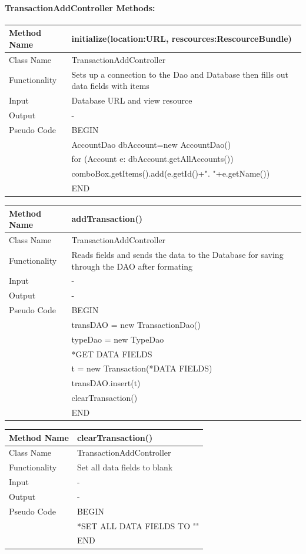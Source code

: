 \documentclass[12pt]{article}
\begin{document}
\paragraph{TransactionAddController Methods:}
\begin{tabular}{ |p{3cm}||p{\colWidth}|  }
	\hline
	Method Name &  initialize(location:URL, rescources:RescourceBundle) \\
	\hline
	Class Name & TransactionAddController\\
	\hline
	Functionality & Sets up a connection to the Dao and Database then fills out data fields with items\\
	\hline
	Input & Database URL and view resource\\
	\hline
	Output & -\\
	\hline
	Pseudo Code & BEGIN\\
	& 		AccountDao dbAccount=new AccountDao() \\
	& 	for (Account e: dbAccount.getAllAccounts()) \\
	&		comboBox.getItems().add(e.getId()+". "+e.getName()) \\
	& END\\
	\hline
\end{tabular}  

\begin{tabular}{ |p{3cm}||p{\colWidth}|  }
	\hline
	Method Name &  addTransaction() \\
	\hline
	Class Name & TransactionAddController\\
	\hline
	Functionality & Reads fields and sends the data to the Database for saving through the DAO after formating\\
	\hline
	Input & - \\
	\hline
	Output & -\\
	\hline
	Pseudo Code & BEGIN\\
	& 	transDAO = new TransactionDao() \\
	& 	typeDao = new TypeDao \\
	&	*GET DATA FIELDS \\
	& 	t = new Transaction(*DATA FIELDS)\\
	& 	transDAO.insert(t)\\
	& clearTransaction()\\
	& END\\
	\hline
\end{tabular} 

\begin{tabular}{ |p{3cm}||p{\colWidth}|  }
	\hline
	Method Name &  clearTransaction() \\
	\hline
	Class Name & TransactionAddController\\
	\hline
	Functionality & Set all data fields to blank\\
	\hline
	Input & -\\
	\hline
	Output & -\\
	\hline
	Pseudo Code & BEGIN\\
	& 	*SET ALL DATA FIELDS TO "" \\&END\\
	\hline
\end{tabular} 
\end{document}
